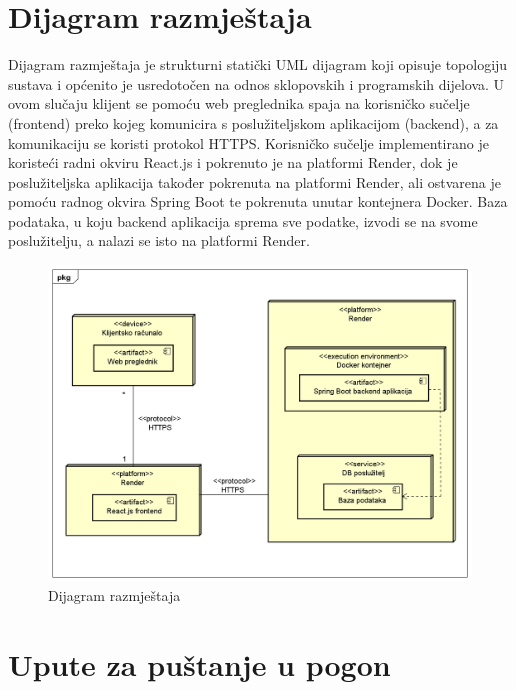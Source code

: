 			\eject


		
		
		\section{Dijagram razmještaja}
			
			Dijagram razmještaja je strukturni statički UML dijagram koji opisuje topologiju sustava i općenito je usredotočen na odnos sklopovskih i programskih dijelova. U ovom slučaju klijent se pomoću web preglednika spaja na korisničko sučelje (frontend) preko kojeg komunicira s poslužiteljskom aplikacijom (backend), a za komunikaciju se koristi protokol HTTPS. Korisničko sučelje  implementirano je koristeći radni okviru React.js i pokrenuto je na platformi Render, dok je poslužiteljska aplikacija također pokrenuta na platformi Render, ali ostvarena je pomoću radnog okvira Spring Boot te pokrenuta unutar kontejnera Docker. Baza podataka, u koju backend aplikacija sprema sve podatke, izvodi se na svome poslužitelju, a nalazi se isto na platformi Render.
			
			\begin{figure}[H]
				\includegraphics[width=\textwidth]{dijagrami/DeploymentDiagram.PNG} 
				\caption{Dijagram razmještaja}
				\label{fig:DeploymentDiagram}
			\end{figure}
			
			\eject 
		
		\section{Upute za puštanje u pogon}
		
